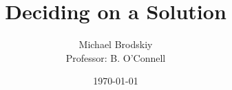 


\title{Deciding on a Solution}
\date{\today}
\author{Michael Brodskiy\\ \small Professor: B. O'Connell}



\maketitle

